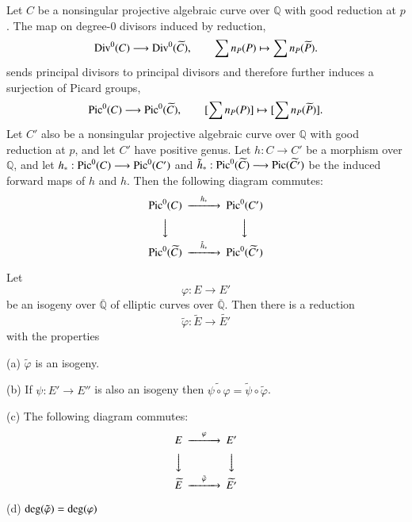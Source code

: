 \begin{theorem}
    Let $C$ be a nonsingular projective algebraic curve over $\mathbb{Q}$ with good reduction at $p$. The map on 
    degree-0 divisors induced by reduction, 
    \begin{equation*}
        {\rm Div}^0(C)\longrightarrow {\rm Div}^0(\widetilde{C}), \qquad \sum n_P(P) \mapsto \sum n_P(\widetilde{P}).
    \end{equation*}
    sends principal divisors to principal divisors and therefore further induces a surjection of Picard groups,
    \begin{equation*}
        {\rm Pic}^0(C)\longrightarrow {\rm Pic}^0(\widetilde{C}), \qquad [\sum n_P(P)] \mapsto [\sum n_P(\widetilde{P})].
    \end{equation*}
    Let $C'$ also be a nonsingular projective algebraic curve over $\mathbb{Q}$ with good reduction at $p$, and let $C'$
    have positive genus. Let $h:C\longrightarrow C'$ be a morphism over $\mathbb{Q}$, and let 
    $h_*:{\rm Pic}^0(C)\longrightarrow {\rm Pic}^0(C')$ and $\tilde{h}_*:{\rm Pic}^0(\widetilde{C})\longrightarrow {\rm Pic}(\widetilde{C'})$
    be the induced forward maps of $h$ and $h$. Then the following diagram commutes: 
    $$\begin{CD}
        {\rm Pic}^0 (C) @>h_*>> {\rm Pic}^0(C')\\
        @VVV @VVV\\
        {\rm Pic}^0 (\widetilde{C}) @>\tilde{h}_*>> {\rm Pic}^0(\widetilde{C'})
    \end{CD}$$
    \label{theorem:reduce_Picard}
\end{theorem}

\begin{theorem}
    Let 
    \begin{equation*}
        \varphi: E\longrightarrow E'
    \end{equation*}
    be an isogeny over $\overline{\mathbb{Q}}$ of elliptic curves over $\overline{\mathbb{Q}}$. Then there is a reduction
    \begin{equation*}
        \tilde{\varphi}: \widetilde{E}\longrightarrow \widetilde{E'}
    \end{equation*} 
    with the properties\par
    (a) $\tilde{\varphi}$ is an isogeny.\par
    (b) If $\psi:E'\longrightarrow E''$ is also an isogeny then $\widetilde{\psi \circ \varphi}=\tilde{\psi}\circ\tilde{\varphi}$.\par
    (c) The following diagram commutes:
    $$\begin{CD}
        E @>\varphi>> E'\\
        @VVV @VVV\\
        \widetilde{E} @>\tilde{\varphi}>> \widetilde{E'}
    \end{CD}$$\par
    (d) ${\rm deg}(\tilde{\varphi})={\rm deg}(\varphi)$
\end{theorem}

